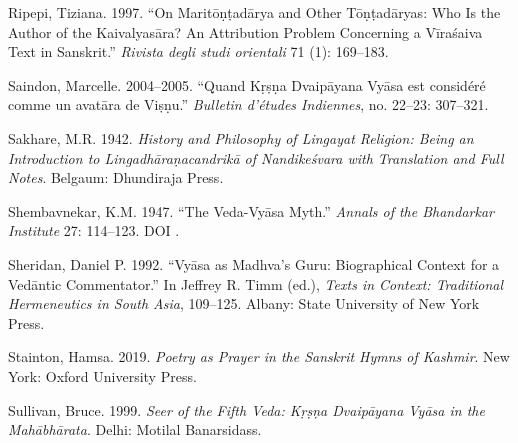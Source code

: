 \begin{hangparas}{0.125in}{1}
          \label{Ripepi1997}Ripepi, Tiziana. 1997. “On Maritōṇṭadārya and Other Tōṇṭadāryas: Who Is the Author of the Kaivalyasāra? An Attribution Problem Concerning a Vīraśaiva Text in Sanskrit.” \emph{Rivista degli studi orientali} 71 (1): 169–183.\medskip


          \label{Saindon20042005}Saindon, Marcelle. 2004–2005. “Quand Kṛṣṇa Dvaipāyana Vyāsa est considéré comme un avatāra de Viṣṇu.” \emph{Bulletin d’études Indiennes}, no. 22–23: 307–321.\medskip


          \label{Sakhare1942}Sakhare, M.\thinskip{}R. 1942. \emph{History and Philosophy of Lingayat Religion: Being an Introduction to Lingadhāraṇacandrikā of Nandikeśvara with Translation and Full Notes}. Belgaum: Dhundiraja Press.\medskip


          \label{Shembavnekar1947}Shembavnekar, K.\thinskip{}M. 1947. “The Veda-Vyāsa Myth.” \emph{Annals of the Bhandarkar Institute} 27: 114–123. DOI \href{https://doi.org/}{}.\medskip


          \label{Sheridan1992}Sheridan, Daniel P. 1992. “Vyāsa as Madhva’s Guru: Biographical Context for a Vedāntic Commentator.” In Jeffrey R. Timm (ed.), \emph{Texts in Context: Traditional Hermeneutics in South Asia}, 109–125. Albany: State University of New York Press.\medskip


          \label{Stainton2019}Stainton, Hamsa. 2019. \emph{Poetry as Prayer in the Sanskrit Hymns of Kashmir}. New York: Oxford University Press.\medskip


          \label{Sullivan1999}Sullivan, Bruce. 1999. \emph{Seer of the Fifth Veda: Kṛṣṇa Dvaipāyana Vyāsa in the Mahābhārata}. Delhi: Motilal Banarsidass.\medskip


	
\end{hangparas}

    

